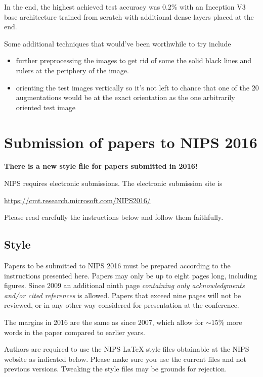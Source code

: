 \documentclass{article}
\begin{document}
In the end, the highest achieved test accuracy was 0.2\% with an Inception V3 base architecture trained from scratch with additional dense layers placed at the end.

Some additional techniques that would've been worthwhile to try include

\begin{itemize}
\item further preprocessing the images to get rid of some the solid black lines and rulers at the periphery of the image.
\item orienting the test images vertically so it's not left to chance that one of the 20 augmentations would be at the exact orientation as the one arbitrarily oriented test image
\end{itemize}

\section{Submission of papers to NIPS 2016}

\textbf{There is a new style file for papers submitted in 2016!}

NIPS requires electronic submissions.  The electronic submission site
is
\begin{center}
  \url{https://cmt.research.microsoft.com/NIPS2016/}
\end{center}

Please read carefully the instructions below and follow them
faithfully.

\subsection{Style}

Papers to be submitted to NIPS 2016 must be prepared according to the
instructions presented here. Papers may only be up to eight pages
long, including figures. Since 2009 an additional ninth page
\emph{containing only acknowledgments and/or cited references} is
allowed. Papers that exceed nine pages will not be reviewed, or in any
other way considered for presentation at the conference.

The margins in 2016 are the same as since 2007, which allow for
$\sim$$15\%$ more words in the paper compared to earlier years.

Authors are required to use the NIPS \LaTeX{} style files obtainable
at the NIPS website as indicated below. Please make sure you use the
current files and not previous versions. Tweaking the style files may
be grounds for rejection.
\end{document}
